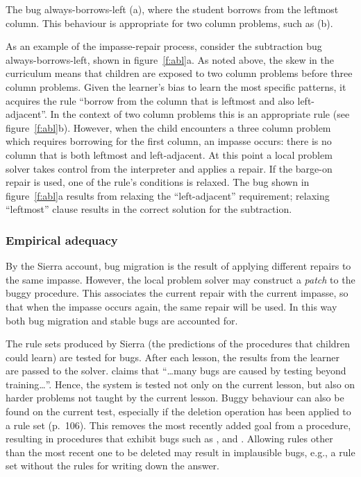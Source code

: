 \begin{fancyfigure}
\centerline{}
\caption{The bug always-borrows-left (a), where the student
borrows from the leftmost column.  This behaviour is
appropriate for two column problems, such as (b).}\label{f:abl}
\end{fancyfigure}

As an example of the impasse-repair process, consider the subtraction bug
always-borrows-left, shown in figure~\ref{f:abl}a. As noted above, the
skew in the curriculum means that children are exposed to two column
problems before three column problems. Given the learner's bias to learn
the most specific patterns, it acquires the rule ``borrow from the column
that is leftmost and also left-adjacent''.  In the context of two column
problems this is an appropriate rule (see figure~\ref{f:abl}b).  However,
when the child encounters a three column problem which requires borrowing
for the first column, an impasse occurs: there is no column that is both
leftmost and left-adjacent.  At this point a local problem solver takes
control from the interpreter and applies a repair.  If the barge-on repair
is used, one of the rule's conditions is relaxed.  The bug shown in
figure~\ref{f:abl}a results from relaxing the ``left-adjacent''
requirement; relaxing ``leftmost'' clause results
in the correct solution for the subtraction.

\subsubsection{Empirical adequacy}\label{s:emprical}

By the Sierra account, bug
migration is the result of applying different repairs to the same
impasse.  However, the local problem solver
may construct a {\em patch} to
the buggy procedure.  This associates the current repair
with the current impasse, so that when the impasse occurs again, the same
repair will be used.  In this
way both bug migration and stable bugs are accounted for.

The rule sets produced by Sierra (the predictions of the procedures that
children could learn) are tested for bugs.  After each lesson, the results
from the learner are passed to the solver.  claims
that ``\ldots many bugs are caused by testing beyond training\ldots''.
Hence, the system is tested not only on the current lesson, but also on
harder problems not taught by the current lesson.  Buggy behaviour can also
be found on the current test, especially if the deletion operation has been
applied to a rule set (p.~106). This removes the most
recently added goal from a procedure, resulting in procedures that exhibit
bugs such as ,  and .
Allowing rules other than the most
recent one to be deleted may result in implausible bugs, e.g., a rule set
without the rules for writing down the answer.


